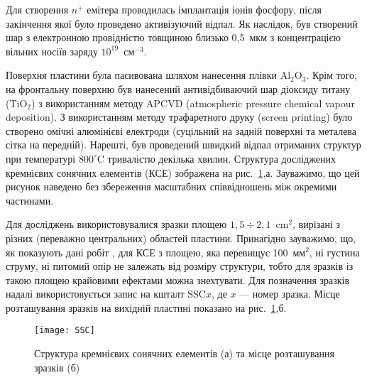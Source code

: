 Для створення $n^+$ емітера проводилась імплантація іонів фосфору, після закінчення якої було проведено активізуючий відпал.
Як наслідок, був створений шар з електронною провідністю товщиною близько  0,5~мкм з концентрацією вільних носіїв заряду $10^{19}$~см$^{-3}$.

Поверхня пластини була пасивована шляхом нанесення плівки Al$_2$O$_3$.
Крім того, на фронтальну поверхню був нанесений антивідбиваючий шар діоксиду титану (TiO$_2$) з використанням методу APCVD (atmospheric pressure chemical  vapour  deposition).
З використанням методу трафаретного друку (screen printing) було створено омічні алюмінієві електроди (суцільний на задній поверхні та металева сітка на передній).
Нарешті, був проведений швидкий відпал отриманих структур при температурі $800^\circ$C тривалістю декілька хвилин.
Структура досліджених кремнієвих сонячних елементів (КСЕ) зображена на рис.~\ref{figSSC},а.
Зауважимо, що цей рисунок наведено без збереження масштабних співвідношень між окремими частинами.

Для досліджень використовувалися зразки площею $1,5\div2,1$~cm$^{2}$, вирізані з різних (переважно центральних) областей пластини.
Принагідно зауважимо, що, як показують дані робіт \cite{Breitenstein2013,SC:Area}, для КСЕ з площею, яка
перевищує 100~мм$^2$, ні густина струму, ні питомий опір не залежать від розміру структури,
тобто для зразків із такою площею крайовими ефектами можна знехтувати.
Для позначення зразків надалі використовується запис на кшталт SSC$x$, де $x$ --- номер зразка.
Місце розташування зразків на вихідній пластині показано на рис.~\ref{figSSC},б.

\begin{figure}
\center
\texttt{[image: SSC]}%
\caption{\label{figSSC}
Структура кремнієвих сонячних елементів (а) та місце розташування зразків (б)
}
\end{figure}


